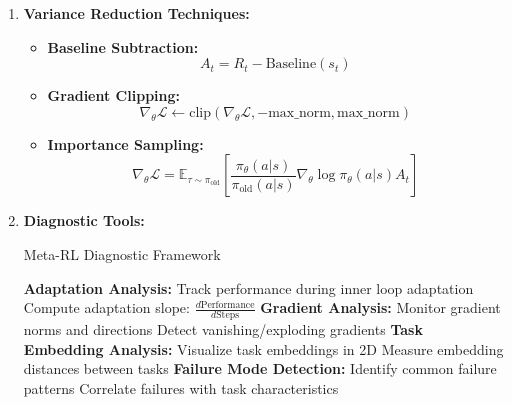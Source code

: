 \documentclass[12pt]{article}
\begin{document}
{{\begin{enumerate}
				\begin{algorithm}[H]
				\caption{Hierarchical Credit Assignment}
				\begin{algorithmic}[1]
				\STATE \textbf{Task-Level Value:} $V_{task}(\mathcal{T})$ - expected return after adaptation
				\STATE \textbf{State-Level Value:} $V_{state}(s)$ - value of individual states
				\STATE \textbf{Compute Advantages:}
				\STATE $A_{task} = R_{task} - V_{task}(\mathcal{T})$
				\STATE $A_{state} = R_{state} - V_{state}(s)$
				\STATE \textbf{Separate Updates:}
				\STATE Update meta-policy using $A_{task}$
				\STATE Update task-policy using $A_{state}$
				\end{algorithmic}
				\end{algorithm}
				
				\item \textbf{Variance Reduction Techniques:}
				
				\begin{itemize}
					\item \textbf{Baseline Subtraction:}
					\begin{equation}
					A_t = R_t - \text{Baseline}(s_t)
					\end{equation}
					
					\item \textbf{Gradient Clipping:}
					\begin{equation}
					\nabla_\theta \mathcal{L} \leftarrow \text{clip}(\nabla_\theta \mathcal{L}, -\text{max\_norm}, \text{max\_norm})
					\end{equation}
					
					\item \textbf{Importance Sampling:}
					\begin{equation}
					\nabla_\theta \mathcal{L} = \mathbb{E}_{\tau \sim \pi_{\text{old}}} \left[ \frac{\pi_\theta(a|s)}{\pi_{\text{old}}(a|s)} \nabla_\theta \log \pi_\theta(a|s) A_t \right]
					\end{equation}
				\end{itemize}
				
				\item \textbf{Diagnostic Tools:}
				
				\begin{algorithm}[H]
				\caption{Meta-RL Diagnostic Framework}
				\begin{algorithmic}[1]
				\STATE \textbf{Adaptation Analysis:}
				\STATE Track performance during inner loop adaptation
				\STATE Compute adaptation slope: $\frac{d\text{Performance}}{d\text{Steps}}$
				\STATE \textbf{Gradient Analysis:}
				\STATE Monitor gradient norms and directions
				\STATE Detect vanishing/exploding gradients
				\STATE \textbf{Task Embedding Analysis:}
				\STATE Visualize task embeddings in 2D
				\STATE Measure embedding distances between tasks
				\STATE \textbf{Failure Mode Detection:}
				\STATE Identify common failure patterns
				\STATE Correlate failures with task characteristics
				\end{algorithmic}
				\end{algorithm}
			\end{enumerate}
			
}}
\end{document}
